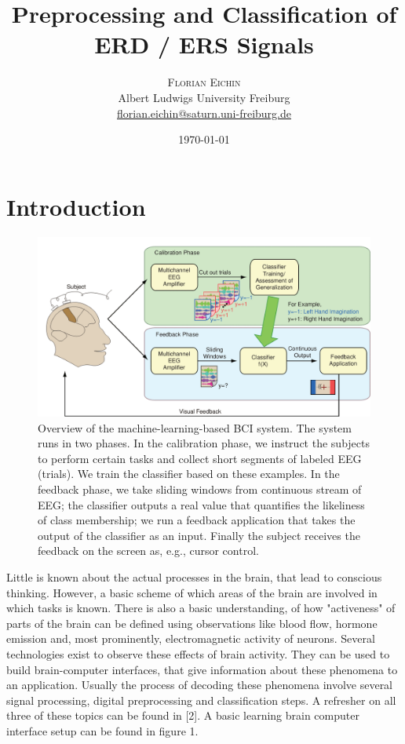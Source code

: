 \documentclass[12pt,twoside,twocolumn]{article}
\title{Preprocessing and Classification of ERD / ERS Signals} %
\author{%
\textsc{Florian Eichin} \\[1ex] %
\normalsize Albert Ludwigs University Freiburg \\ %
\normalsize \href{mailto:florian.eichin@saturn.uni-freiburg.de}{florian.eichin@saturn.uni-freiburg.de} %
}
\date{\today} %
\begin{document}
\maketitle

\section{Introduction}

\begin{figure}
\centering
\includegraphics[scale=0.3]{framework.png}
\caption{Overview of the machine-learning-based BCI system. The system runs in two phases. In the calibration phase, we instruct the subjects to perform certain tasks and collect short segments of labeled EEG (trials). We train the classifier based on these examples. In the feedback phase, we take sliding windows from continuous stream of EEG; the classifier outputs a real value that quantifies the likeliness of class membership; we run a feedback application that takes the output of the classifier as an input. Finally the subject receives the feedback on the screen as, e.g., cursor control.}
\end{figure}

Little is known about the actual processes in the brain, that lead to conscious thinking. However, a basic scheme of which areas of the brain are involved in which tasks is known. There is also a basic understanding, of how "activeness" of parts of the brain can be defined using observations like blood flow, hormone emission and, most prominently, electromagnetic activity of neurons. Several technologies exist to observe these effects of brain activity. They can be used to build brain-computer interfaces, that give information about these phenomena to an application. Usually the process of decoding these phenomena involve several signal processing, digital preprocessing and classification steps. A refresher on all three of these topics can be found in [2]. A basic learning brain computer interface setup can be found in figure 1.
\end{document}
